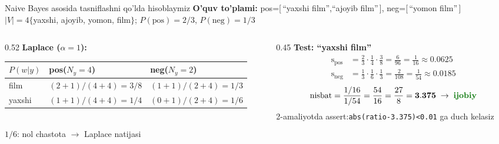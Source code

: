 \documentclass[aspectratio=169,11pt]{beamer}
\begin{document}
\begin{frame}{Naive Bayes asosida tasniflashni qo'lda hisoblaymiz}
  \small
  \textbf{O'quv to'plami:}\;
  pos=[\,``yaxshi film'',``ajoyib film''\,],\;
  neg=[\,``yomon film''\,]\\[2pt]
  $|V|{=}4$\;$\{$yaxshi, ajoyib, yomon, film$\}$;\quad
  $P(\text{pos}){=}2/3$,\; $P(\text{neg}){=}1/3$
  \vspace{5pt}
  \begin{columns}[T]
    \begin{column}{0.52\textwidth}
      \textbf{Laplace ($\alpha{=}1$):}\\[3pt]
      \footnotesize
      \begin{tabular}{@{}lll@{}}
        \toprule
        $P(w|y)$ & pos\;($N_y{=}4$) & neg\;($N_y{=}2$) \\
        \midrule
        film   & $(2{+}1)/(4{+}4)=3/8$ & $(1{+}1)/(2{+}4)=1/3$ \\
        yaxshi & $(1{+}1)/(4{+}4)=1/4$ &
                 \alert{$(0{+}1)/(2{+}4)=1/6$} \\
        \bottomrule
      \end{tabular}\\[3pt]
      \textcolor{halfgray}{\tiny
        \alert{$1/6$}: nol chastota $\to$ Laplace natijasi}
    \end{column}
    \begin{column}{0.45\textwidth}
      \textbf{Test: ``yaxshi film''}\\[3pt]
      \small
      \begin{align*}
        \text{s}_{\text{pos}}
          &=\tfrac{2}{3}\cdot\tfrac{1}{4}\cdot\tfrac{3}{8}
          =\tfrac{6}{96}=\tfrac{1}{16}\approx 0.0625\\[4pt]
        \text{s}_{\text{neg}}
          &=\tfrac{1}{3}\cdot\tfrac{1}{6}\cdot\tfrac{1}{3}
          =\tfrac{2}{108}=\tfrac{1}{54}\approx 0.0185
      \end{align*}
      \[
        \text{nisbat}
        =\frac{1/16}{1/54}
        =\frac{54}{16}
        =\frac{27}{8}
        =\mathbf{3.375}
        \;\to\;\textcolor{deepgreen}{\textbf{ijobiy}}
      \]
      \footnotesize\textcolor{halfgray}{%
        2-amaliyotda assert:\;\texttt{abs(ratio-3.375)<0.01} ga duch kelasiz}
    \end{column}
  \end{columns}
\end{frame}
\end{document}
